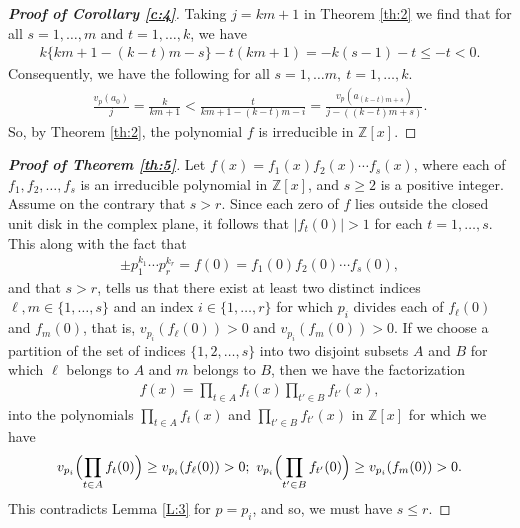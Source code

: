 \documentclass[12pt]{amsart}%
\begin{document}
\begin{proof}[\bf Proof of Corollary \ref{c:4}]
Taking $j=km+1$ in Theorem \ref{th:2} we  find that for all $s=1,\ldots, m$ and $t=1,\ldots, k$, we have
\begin{eqnarray*}
k\{km+1-(k-t)m-s\}-t(km+1)=-k(s-1)-t\leq -t<0.
\end{eqnarray*}
Consequently, we have the following for all $s=1,\ldots m,~t=1,\ldots, k$.
\begin{eqnarray*}
\frac{v_p(a_0)}{j}=\frac{k}{km+1}<\frac{t}{km+1-(k-t)m-i}=\frac{v_p(a_{(k-t)m+s})}{j-((k-t)m+s)}.
\end{eqnarray*}
So, by Theorem \ref{th:2}, the polynomial $f$ is irreducible in $\mathbb{Z}[x]$.
\end{proof}
\begin{proof}[\bf Proof of Theorem \ref{th:5}]Let $f(x)=f_1(x)f_2(x)\cdots f_s(x)$, where each of $f_1,f_2,\ldots, f_s$ is an irreducible polynomial in $\mathbb{Z}[x]$, and  $s\geq 2$ is a positive integer. Assume on the contrary that $s>r$. Since each zero of $f$ lies outside the closed unit disk in the complex plane, it follows that $|f_t(0)|> 1$ for each $t=1,\ldots, s$. This along with the fact that
\begin{eqnarray*}
\pm p_1^{k_1}\cdots p_r^{k_r}=f(0)=f_1(0)f_2(0)\cdots f_s(0),
\end{eqnarray*}
and that $s>r$, tells us that there exist at least two distinct indices $\ell, m \in \{1,\ldots, s\}$  and an index $i\in \{1,\ldots, r\}$ for which $p_i$ divides each of $f_\ell(0)$ and $f_{m}(0)$, that is, $v_{p_i}(f_\ell(0))>0$ and $v_{p_i}(f_m(0))>0$. If we choose a partition of the set of indices $\{1,2,\ldots, s\}$ into two disjoint subsets $A$ and $B$ for which $\ell$ belongs to $A$ and $m$ belongs to $B$, then
we have the factorization
\begin{eqnarray*}
f(x)=\prod_{t\in A} f_t(x) \prod_{t'\in B} f_{t'}(x),
\end{eqnarray*}
into the polynomials $\prod_{t\in A} f_t(x)$ and $\prod_{t'\in B} f_{t'}(x)$ in $\mathbb{Z}[x]$ for which we have
\begin{eqnarray*}
v_{p_i}\Bigl(\prod_{t\in A} f_t(0)\Bigr)\geq v_{p_i}(f_\ell(0))>0;~ v_{p_i}\Bigl(\prod_{t'\in B} f_{t'}(0)\Bigr)\geq v_{p_i}(f_m(0))>0.
\end{eqnarray*}
This contradicts Lemma \ref{L:3} for $p=p_i$, and so, we must have $s\leq r$.
\end{proof}
\end{document}
